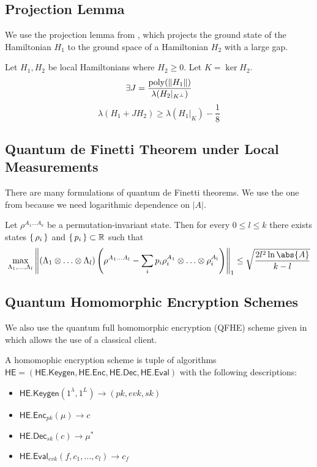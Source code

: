 \subsection{Projection Lemma}

We use the projection lemma from \cite{kempe_kitaev_regev_2006}, which projects the ground state of the Hamiltonian $H_1$ to the ground space of a Hamiltonian $H_2$ with a large gap.

\begin{thm}
	Let $H_1, H_2$ be local Hamiltonians where $H_2\geq0$. Let $K=\ker H_2$.
	$$\exists J=\frac{\operatorname*{\operatorname{poly}}(\left\lVert H_1\right\rVert)}{\lambda(H_2|_{K^\bot})}$$
	$$\lambda(H_1+JH_2)\geq\lambda(H_1\big|_K)-\frac{1}{8}$$
\end{thm}

\subsection{Quantum de Finetti Theorem under Local Measurements}

There are many formulations of quantum de Finetti theorems. We use the one from \cite{Brandão2017} because we need logarithmic dependence on $|A|$.
\begin{thm}
	\label{deFinetti}
	Let $\rho^{A_1\ldots A_k}$ be a permutation-invariant state. Then for every $0\leq l\leq k$ there exists states $\set{\rho_i}$ and $\set{p_i}\subset\mathbb{R}$ such that
	$$\max_{\Lambda_1,\ldots,\Lambda_l}\norm{(\Lambda_1\otimes\ldots\otimes\Lambda_l)\left(\rho^{A_1\ldots A_l}-\sum_ip_i\rho_i^{A_1}\otimes\ldots\otimes\rho_i^{A_l}\right)}_1\leq\sqrt{\frac{2l^2\ln\abs{A}}{k-l}}$$
\end{thm}

\subsection{Quantum Homomorphic Encryption Schemes}

We also use the quantum full homomorphic encryption (QFHE) scheme given in \cite{mahadev_qfhe} which allows the use of a classical client.

\begin{dfn}
	A homomophic encryption scheme is tuple of algorithms $\mathsf{HE}=(\mathsf{HE.Keygen}, \mathsf{HE.Enc}, \mathsf{HE.Dec}, \mathsf{HE.Eval})$ with the following descriptions:
	\begin{itemize}
		\item $\mathsf{HE.Keygen}(1^\lambda, 1^L)\rightarrow(pk, evk, sk)$
		\item $\mathsf{HE.Enc}_{pk}(\mu)\rightarrow c$
		\item $\mathsf{HE.Dec}_{sk}(c)\rightarrow \mu^*$
		\item $\mathsf{HE.Eval}_{evk}(f, c_1, \ldots, c_l)\rightarrow c_f$
	\end{itemize}
\end{dfn}

